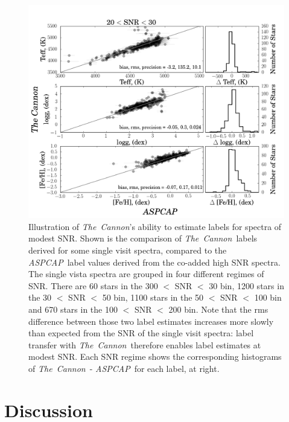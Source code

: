 \documentclass[12pt, preprint]{aastex}
\newcommand{\tc}{\textsl{The~Cannon}}
\newcommand{\aspcap}{\textsl{ASPCAP}}
\begin{document}
\begin{figure}[!h]
\includegraphics[scale=0.25]{./plots/SNR20to30.png}
    \caption{Illustration of \tc's ability to estimate labels for spectra of modest SNR. Shown is the comparison of \tc\ labels derived for some single visit spectra, compared to the \aspcap\ label values derived from the co-added high SNR spectra. The single vista spectra are grouped in four different regimes of SNR. There are 60 stars in the 300 $<$  SNR $<$ 30 bin, 1200 stars in the 30 $<$ SNR $<$ 50 bin, 1100 stars in the 50 $<$ SNR $<$ 100 bin and 670 stars in the 100 $<$  SNR $<$ 200 bin. Note that the rms difference between those two label estimates increases more slowly than expected from the SNR of the single visit spectra: label transfer with \tc\  therefore enables label estimates at modest SNR. Each SNR regime shows the corresponding histograms of \tc\ - \aspcap\ for each label, at right.}
\label{fig:SNR}
\end{figure}

\clearpage
\section{Discussion}
\end{document}

